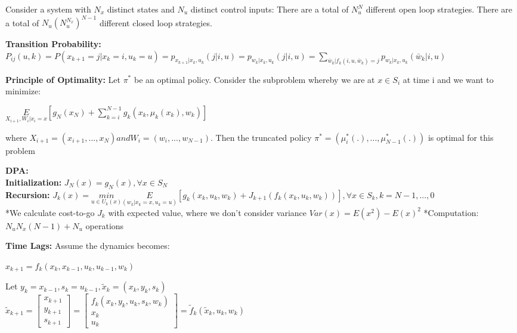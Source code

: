 \documentclass[10pt,landscape]{article}
\begin{document}
\begin{multicols*}{4}
Consider a system with $N_x$ distinct states and $N_u$ distinct control inputs:
There are a total of $N_u ^ N$ different open loop strategies.
There are a total of $N_u(N_u ^ {N_x}) ^ {N-1}$ different closed loop strategies.

\textbf{Transition Probability:} \\
$P_{ij}(u,k) = P(x_{k+1} = j | x_k = i, u_k = u) = p_{x_{k+1}|x_k,u_k}(j|i,u) = p_{w_k|x_k,u_k}(j|i,u) = \sum_{\bar{w}_k | f_k(i,u,\bar{w}_k) = j} p_{w_k|x_k,u_k}(\bar{w}_k|i,u) $


\textbf{Principle of Optimality:} Let $\pi ^ *$ be an optimal policy. Consider the subproblem whereby
we are at $x \in S_i$ at time i and we want to minimize:

$ \underset{X_{i+1}, W_i| x_i=x}{E} [g_N(x_N) + \sum_{k=i}^{N-1} g_k(x_k, \mu_k(x_k), w_k)]$

where $X_{i+1} = (x_{i+1},...,x_N) and W_i = (w_i,...,w_{N-1})$. Then the truncated policy $\pi ^ * = (\mu_i ^ *(.),...,\mu_{N-1} ^ * (.))$ is optimal for this problem


\textbf{DPA:}\\
\textbf{Initialization:} $J_N(x) = g_N(x), \forall x \in S_N$\\
\textbf{Recursion:} 
$J_k(x) = \underset{u \in U_k(x)}{min} \underset{(w_k | x_k=x, u_k=u)}{E} [g_k(x_k,u_k, w_k) + J_{k+1} (f_k(x_k,u_k,w_k))], \forall x \in S_k, k = N-1,...,0$\\

*We calculate cost-to-go $J_k$ with expected value, where we don't consider variance $Var(x) = E(x^2) - E(x) ^ 2$
*Computation: $N_uN_x(N-1)+N_u$ operations
 
\textbf{Time Lags:}
Assume the dynamics becomes:\\
\begin{center}
	$x_{k+1} = f_k(x_k, x_{k-1}, u_k, u_{k-1}, w_k)$
\end{center}
Let $y_k=x_{k-1}, s_k = u_{k-1}, \tilde{x}_k = (x_k, y_k, s_k)$\\
$\tilde{x}_{k+1} = \begin{bmatrix}
	x_{k+1}\\
	y_{k+1}\\
	s_{k+1}
\end{bmatrix} = \begin{bmatrix}
f_k(x_k,y_k,u_k,s_k,w_k)\\
x_k\\
u_k
\end{bmatrix} = \tilde{f}_k(\tilde{x}_k,u_k,w_k)$


\end{multicols*}
\end{document}
